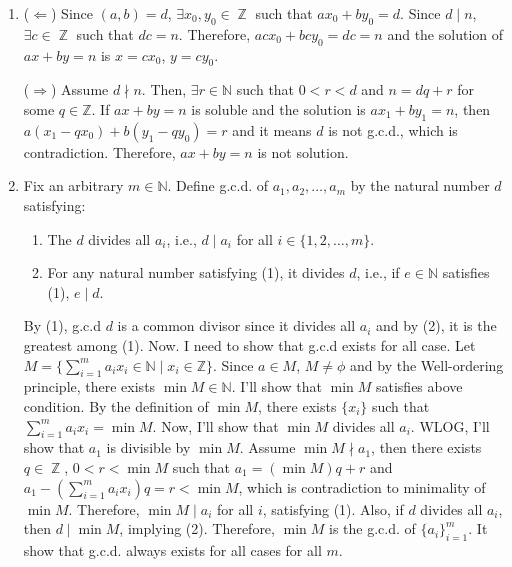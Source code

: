 \documentclass[12pt]{article}
\newenvironment{problem}[2][Problem]{\begin{trivlist}
\item[\hskip \labelsep {\bfseries #1}\hskip \labelsep {\bfseries #2.}]}{\end{trivlist}}
\DeclareMathOperator{\zz}{\mathbb{Z}}
\begin{document}




\begin{problem}{1}
\end{problem}
\begin{enumerate}

    \item[(a)] ($\Leftarrow$) Since $(a,b)=d$, $\exists x_0, y_0\in \zz$ such that $ax_0+by_0=d$. Since $d\mid n$, $\exists c\in \zz$ such that $dc=n$. Therefore, $acx_0+bcy_0=dc=n$ and the solution of $ax+by=n$ is $x=cx_0$, $y=cy_0$.
    
    ($\Rightarrow$) Assume $d\nmid n$. Then, $\exists r\in \mathbb{N}$ such that $0<r<d$ and $n=dq+r$ for some $q\in \mathbb{Z}$. If $ax+by=n$ is soluble and the solution is $ax_1+by_1=n$, then $a(x_1-qx_0)+b(y_1-qy_0)=r$ and it means $d$ is not g.c.d., which is contradiction. Therefore, $ax+by=n$ is not solution.

    \item[(b)] Fix an arbitrary $m\in \mathbb{N}$. Define g.c.d. of $a_1, a_2, \ldots, a_m$ by the natural number $d$ satisfying:
    
    \begin{enumerate}
    	\item[(1)] The $d$ divides all $a_i$, i.e., $d \mid a_i$ for all $i\in \{1, 2, \ldots, m\}$.
    	\item[(2)] For any natural number satisfying (1), it divides $d$, i.e., if $e\in \mathbb{N}$ satisfies (1), $e\mid d$.
    \end{enumerate}
    
    By (1), g.c.d $d$ is a common divisor since it divides all $a_i$ and by (2), it is the greatest among (1). Now. I need to show that g.c.d exists for all case.    
    Let $M=\{\sum\limits_{i=1}^m a_i x_i\in \mathbb{N} \mid x_i\in \mathbb{Z}\}$. Since $a\in M$, $M\neq \phi$ and by the Well-ordering principle, there exists $\min M\in \mathbb{N}$. I'll show that $\min M$ satisfies above condition.
    By the definition of $\min M$, there exists $\{x_i\}$ such that $\sum\limits_{i=1}^m a_i x_i=\min M$. Now, I'll show that $\min M$ divides all $a_i$. WLOG, I'll show that $a_1$ is divisible by $\min M$. Assume $\min M \nmid a_1$, then there exists $q\in \zz$, $0<r<\min M$ such that $a_1=(\min M)q+r$ and $a_1-(\sum\limits_{i=1}^m a_i x_i)q=r<\min M$, which is contradiction to minimality of $\min M$. Therefore, $\min M \mid a_i$ for all $i$, satisfying (1).
    Also, if $d$ divides all $a_i$, then $d\mid \min M$, implying (2). Therefore, $\min M$ is the g.c.d. of $\{a_i\}_{i=1}^m$. It show that g.c.d. always exists for all cases for all $m$.
    

\end{enumerate}
\end{document}

